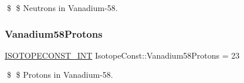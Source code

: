 \$ \$ Neutrons in Vanadium-\/58. \mbox{\label{group___isotope_const-_vanadium-_v58_ga9550b6b7f7a330d927fb48d80f4f07ae}} 
\subsubsection{\texorpdfstring{Vanadium58\+Protons}{Vanadium58Protons}}
{\footnotesize\ttfamily \mbox{\hyperlink{group___isotope_const-_macros_ga5f18360b3e99483a35c32d789e62621c}{I\+S\+O\+T\+O\+P\+E\+C\+O\+N\+S\+T\+\_\+\+I\+NT}} Isotope\+Const\+::\+Vanadium58\+Protons = 23}

\$ \$ Protons in Vanadium-\/58. 